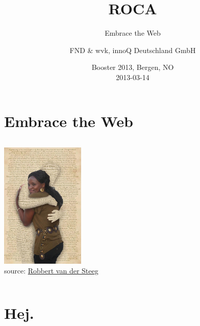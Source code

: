 \documentclass{beamer}
\date{Booster 2013, Bergen, NO \\ 2013-03-14}
\author{FND \& wvk, innoQ Deutschland GmbH}
\title{ROCA}
\subtitle{Embrace the Web}
\begin{document}
  {

  \begin{frame}[plain]
    \titlepage
  \end{frame}
}

\setcounter{tocdepth}{1}

\section{Embrace the Web}

\begin{frame}{\insertsectionhead}
  \begin{columns}
    \begin{column}{4.4cm}
      \includegraphics[width=4cm]{images/embrace.jpg}
      \\
      \tiny source: \href{http://www.flickr.com/photos/robbie73/4289385819/}{Robbert van der Steeg}
    \end{column}

    \begin{column}{6.6cm}
      \tableofcontents
    \end{column}
  \end{columns}
\end{frame}

\section{Hej.}
\end{document}
